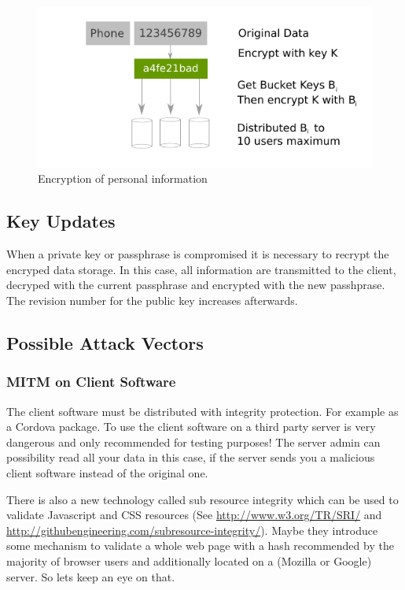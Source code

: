 \documentclass{scrartcl}
\begin{document}
  
   \begin{figure}[ht]
	\centering
  \includegraphics[]{prvInfo.pdf}
	\caption{Encryption of personal information}
	\label{fig3}
\end{figure}

    \subsection{Key Updates}
    When a private key or passphrase is compromised  it is necessary to recrypt the encryped data storage. In this case, all information are transmitted to the client, decryped with the current passphrase and encrypted with the new passhprase. The revision number for the public key increases afterwards.

  \subsection{Possible Attack Vectors}
  
  \subsubsection{MITM on Client Software}
  The client software must be distributed with integrity protection. For example as a Cordova package. To use the client software on a third party server is very dangerous and only recommended for testing purposes! The server admin can possibility read all your data in this case, if the server sends you a malicious client software instead of the original one.
  
   There is also a new technology called sub resource integrity which can be used to validate Javascript and CSS resources (See \url{http://www.w3.org/TR/SRI/} and \url{http://githubengineering.com/subresource-integrity/}). Maybe they introduce some mechanism to validate a whole web page with a hash recommended by the majority of browser users and additionally located on a (Mozilla or Google) server. So lets keep an eye on that.
\end{document}
